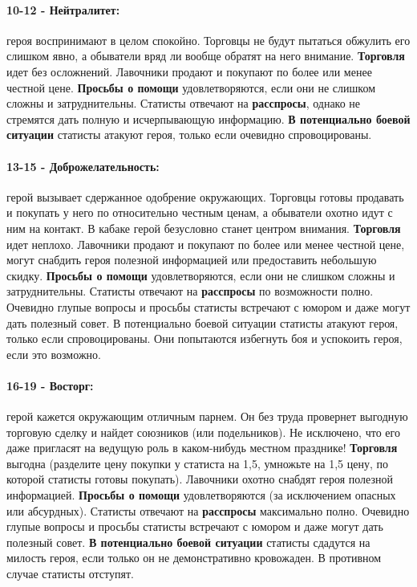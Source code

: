 \paragraph{10-12 - Нейтралитет:} героя воспринимают в целом спокойно. Торговцы не будут пытаться обжулить его слишком явно, а обыватели вряд ли вообще обратят на него внимание.
\textbf{Торговля} идет без осложнений. Лавочники продают и покупают по более или менее честной цене.
\textbf{Просьбы о помощи} удовлетворяются, если они не слишком
сложны и затруднительны. Статисты отвечают на \textbf{расспросы}, однако не стремятся дать полную и исчерпывающую информацию. 
\textbf{В потенциально боевой ситуации} статисты атакуют героя, только если очевидно спровоцированы.
\paragraph{13-15 - Доброжелательность:} герой вызывает сдержанное одобрение окружающих. Торговцы готовы продавать и покупать у него по относительно честным ценам, а обыватели охотно идут с ним на контакт. В кабаке герой безусловно станет центром внимания.
\textbf{Торговля} идет неплохо. Лавочники продают и покупают по более или менее честной цене, могут снабдить героя полезной информацией или предоставить небольшую скидку.
\textbf{Просьбы о помощи} удовлетворяются, если они не слишком сложны и затруднительны. Статисты отвечают на \textbf{расспросы} по возможности полно. Очевидно глупые вопросы и просьбы статисты встречают с юмором и даже могут дать полезный совет. В потенциально боевой ситуации статисты атакуют героя, только если спровоцированы. Они попытаются избегнуть боя и успокоить героя, если это возможно.
\paragraph{16-19 - Восторг:} герой кажется окружающим отличным парнем. Он без труда провернет выгодную торговую сделку и найдет союзников (или подельников). Не исключено, что его даже пригласят на ведущую роль в каком-нибудь местном празднике!
\textbf{Торговля} выгодна (разделите цену покупки у статиста на 1,5, умножьте на 1,5 цену, по которой статисты готовы покупать). Лавочники охотно снабдят героя полезной информацией.
\textbf{Просьбы о помощи} удовлетворяются (за исключением опасных или абсурдных). Статисты отвечают на \textbf{расспросы} максимально полно. Очевидно глупые вопросы и просьбы статисты встречают с юмором и даже могут дать полезный совет.
\textbf{В потенциально боевой ситуации} статисты сдадутся на милость героя, если только он не демонстративно кровожаден. В противном случае статисты отступят.
